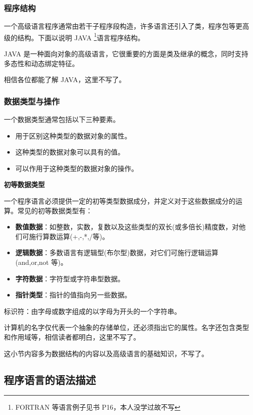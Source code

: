 \subsubsection{程序结构}

一个高级语言程序通常由若干子程序段构造，许多语言还引入了类，程序包等更高级的结构。下面以说明 JAVA \footnote{FORTRAN 等语言例子见书 P16，本人没学过故不写}语言程序结构。

JAVA 是一种面向对象的高级语言，它很重要的方面是类及继承的概念，同时支持多态性和动态绑定特征。

相信各位都能了解 JAVA，这里不写了。

\subsubsection{数据类型与操作}

一个数据类型通常包括以下三种要素。
\begin{itemize}
    \item 用于区别这种类型的数据对象的属性。
    \item 这种类型的数据对象可以具有的值。
    \item 可以作用于这种类型的数据对象的操作。
\end{itemize}

\noindent\textbf{初等数据类型}

一个程序语言必须提供一定的初等类型数据成分，并定义对于这些数据成分的运算。常见的初等数据类型有：
\begin{itemize}
    \item \textbf{数值数据}：如整数，实数，复数以及这些类型的双长(或多倍长)精度数，对他们可施行算数运算(+,-,*,/等)。
    \item \textbf{逻辑数据}：多数语言有逻辑型(布尔型)数据，对它们可施行逻辑运算(and,or,not 等)。
    \item \textbf{字符数据}：字符型或字符串型数据。
    \item \textbf{指针类型}：指针的值指向另一些数据。
\end{itemize}

标识符：由字母或数字组成的以字母为开头的一个字符串。

计算机的名字仅代表一个抽象的存储单位，还必须指出它的属性。名字还包含类型和作用域等，相信读者都明白，这里不写了。

这小节内容多为数据结构的内容以及高级语言的基础知识，不写了。

\subsection{程序语言的语法描述}


